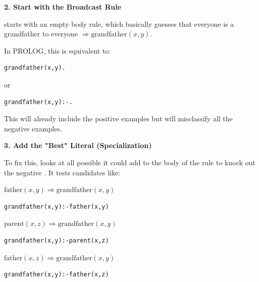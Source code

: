 \textbf{2. Start with the Broadcast Rule}

 starts with an empty body rule, which basically guesses that everyone is a grandfather to everyone \hfill $\Rightarrow \text{grandfather}(x,y)$. 

In PROLOG, this is equivalent to:

\begin{verbatim}
grandfather(x,y).
\end{verbatim}

or

\begin{verbatim}
grandfather(x,y):-.
\end{verbatim}

This will already include the positive examples but will misclassify all the negative examples.

\textbf{3. Add the "Best" Literal  (Specialization)}

To fix this,  looks at all possible  it could add to the body of the rule to knock out the negative . It tests candidates like:

$\text{father}(x,y) \Rightarrow \text{grandfather}(x,y)$

\begin{verbatim}
grandfather(x,y):-father(x,y)
\end{verbatim}


$\text{parent}(x,z) \Rightarrow \text{grandfather}(x,y)$

\begin{verbatim}
grandfather(x,y):-parent(x,z)
\end{verbatim}


$\text{father}(x,z) \Rightarrow \text{grandfather}(x,y)$

\begin{verbatim}
grandfather(x,y):-father(x,z)
\end{verbatim}



